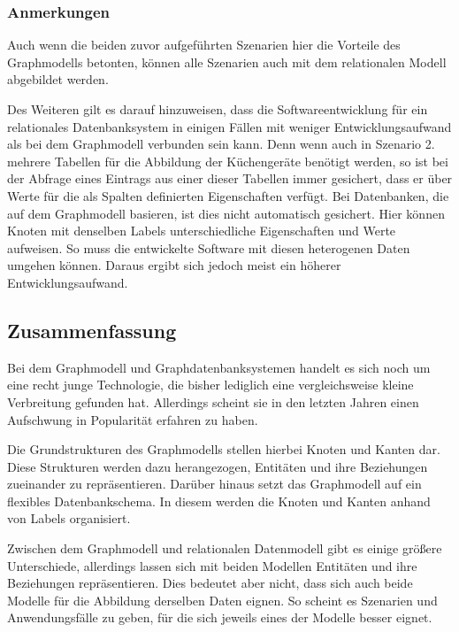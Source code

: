 \subsubsection{Anmerkungen}
Auch wenn die beiden zuvor aufgeführten Szenarien hier die Vorteile des Graphmodells betonten, können alle Szenarien auch mit dem relationalen Modell abgebildet werden. 

Des Weiteren gilt es darauf hinzuweisen, dass die Softwareentwicklung für ein relationales Datenbanksystem in einigen Fällen mit weniger Entwicklungsaufwand als bei dem Graphmodell verbunden sein kann. Denn wenn auch in Szenario 2. mehrere Tabellen für die Abbildung der Küchengeräte benötigt werden, so ist bei der Abfrage eines Eintrags aus einer dieser Tabellen immer gesichert, dass er über Werte für die als Spalten definierten Eigenschaften verfügt. Bei Datenbanken, die auf dem Graphmodell basieren, ist dies nicht automatisch gesichert. Hier können Knoten mit denselben Labels unterschiedliche Eigenschaften und Werte aufweisen. So muss die entwickelte Software mit diesen heterogenen Daten umgehen können. Daraus ergibt sich jedoch meist ein höherer Entwicklungsaufwand. 

\subsection{Zusammenfassung}
Bei dem Graphmodell und Graphdatenbanksystemen handelt es sich noch um eine recht junge Technologie, die bisher lediglich eine vergleichsweise kleine Verbreitung gefunden hat. Allerdings scheint sie in den letzten Jahren einen Aufschwung in Popularität erfahren zu haben. 

Die Grundstrukturen des Graphmodells stellen hierbei Knoten und Kanten dar. Diese Strukturen werden dazu herangezogen, Entitäten und ihre Beziehungen zueinander zu repräsentieren. Darüber hinaus setzt das Graphmodell auf ein flexibles Datenbankschema. In diesem werden die Knoten und Kanten anhand von Labels organisiert.

Zwischen dem Graphmodell und relationalen Datenmodell gibt es einige größere Unterschiede, allerdings lassen sich mit beiden Modellen Entitäten und ihre Beziehungen repräsentieren. Dies bedeutet aber nicht, dass sich auch beide Modelle für die Abbildung derselben Daten eignen. So scheint es Szenarien und Anwendungsfälle zu geben, für die sich jeweils eines der Modelle besser eignet. 